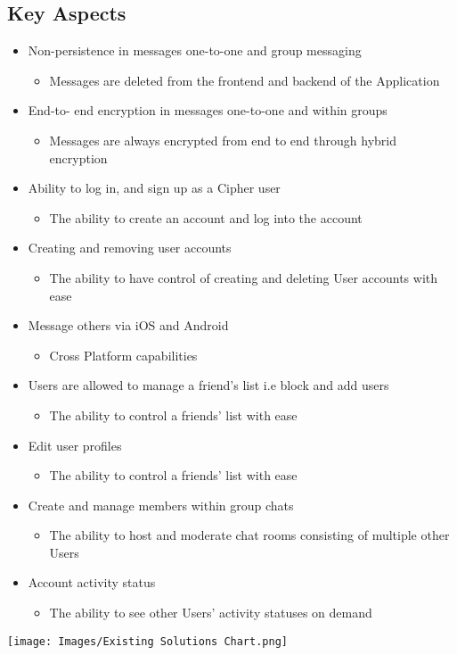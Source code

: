 \documentclass[12pt]{article}
\begin{document}
\subsection{Key Aspects}
\begin{itemize}
    \item Non-persistence in messages one-to-one and group messaging 
    \begin{itemize}
        \item Messages are deleted from the frontend and backend of the Application
    \end{itemize}
    \item End-to- end encryption in messages one-to-one and within groups
\begin{itemize}
        \item Messages are always encrypted from end to end through hybrid encryption
    \end{itemize}
\item Ability to log in, and sign up as a Cipher user
\begin{itemize}
        \item The ability to create an account and log into the account
    \end{itemize}
\item Creating and removing user accounts
 \begin{itemize}
        \item  The ability to have control of creating and deleting User accounts with ease
    \end{itemize}
\item Message others via iOS and Android
\begin{itemize}
        \item   Cross Platform capabilities
    \end{itemize}
\item Users are allowed to manage a friend’s list i.e block and add users
\begin{itemize}
        \item   The ability to control a friends’ list with ease 
    \end{itemize}
\item Edit user profiles
     \begin{itemize}
        \item   The ability to control a friends’ list with ease 
      \end{itemize}
\item Create and manage members within group chats
       \begin{itemize}
        \item  The ability to host and moderate chat rooms consisting of multiple other Users
      \end{itemize}
\item Account activity status
\begin{itemize}
        \item The ability to see other Users’ activity statuses on demand 
      \end{itemize}
\end{itemize}   
\centering\texttt{[image: Images/Existing Solutions Chart.png]} 
\end{document}
